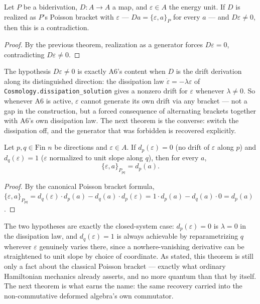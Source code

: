 \begin{theorem}
Let $P$ be a biderivation, $D: A \to A$ a map, and $\varepsilon \in A$ the energy unit. If $D$ is realized as $P$'s Poisson bracket with $\varepsilon$ — $Da = \{\varepsilon, a\}_P$ for every $a$ — and $D\varepsilon \ne 0$, then this is a contradiction.
\begin{proof}
By the previous theorem, realization as a generator forces $D\varepsilon = 0$, contradicting $D\varepsilon \ne 0$.
\end{proof}
\end{theorem}

The hypothesis $D\varepsilon \ne 0$ is exactly A6's content when $D$ is the drift derivation along its distinguished direction: the dissipation law $\dot\varepsilon = -\lambda\varepsilon$ of \texttt{Cosmology.dissipation\_solution} gives a nonzero drift for $\varepsilon$ whenever $\lambda \ne 0$. So whenever A6 is active, $\varepsilon$ cannot generate its own drift via any bracket — not a gap in the construction, but a forced consequence of alternating brackets together with A6's own dissipation law. The next theorem is the converse: switch the dissipation off, and the generator that was forbidden is recovered explicitly.

\begin{theorem}
Let $p, q \in \text{Fin } n$ be directions and $\varepsilon \in A$. If $d_p(\varepsilon) = 0$ (no drift of $\varepsilon$ along $p$) and $d_q(\varepsilon) = 1$ ($\varepsilon$ normalized to unit slope along $q$), then for every $a$,
\[
\{\varepsilon, a\}_{P_{pq}} = d_p(a) .
\]
\begin{proof}
By the canonical Poisson bracket formula, $\{\varepsilon, a\}_{P_{pq}} = d_q(\varepsilon) \cdot d_p(a) - d_q(a) \cdot d_p(\varepsilon) = 1 \cdot d_p(a) - d_q(a) \cdot 0 = d_p(a)$.
\end{proof}
\end{theorem}

The two hypotheses are exactly the closed-system case: $d_p(\varepsilon)=0$ is $\lambda=0$ in the dissipation law, and $d_q(\varepsilon)=1$ is always achievable by reparametrizing $q$ wherever $\varepsilon$ genuinely varies there, since a nowhere-vanishing derivative can be straightened to unit slope by choice of coordinate. As stated, this theorem is still only a fact about the classical Poisson bracket — exactly what ordinary Hamiltonian mechanics already asserts, and no more quantum than that by itself. The next theorem is what earns the name: the same recovery carried into the non-commutative deformed algebra's own commutator.

